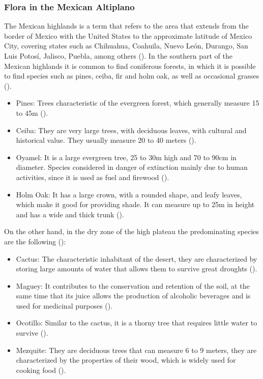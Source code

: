 \documentclass{amsart}
\begin{document}
            \subsubsection{Flora in the Mexican Altiplano}
            The Mexican highlands is a term that refers to the area that extends from the border of Mexico with the United States to the approximate latitude of Mexico City, covering states such as Chihuahua, Coahuila, Nuevo León, Durango, San Luis Potosí, Jalisco, Puebla, among others (\cite{Lifeder}).
            In the southern part of the Mexican highlands it is common to find coniferous forests, in which it is possible to find species such as pines, ceiba, fir and holm oak, as well as occasional grasses (\cite{Lifeder}).
            \begin{itemize}
                \item Pines: Trees characteristic of the evergreen forest, which generally measure 15 to 45m (\cite{Masats}).
                \item Ceiba: They are very large trees, with deciduous leaves, with cultural and historical value. They usually measure 20 to 40 meters (\cite{Anónimo3}).
                \item Oyamel: It is a large evergreen tree, 25 to 30m high and 70 to 90cm in diameter. Species considered in danger of extinction mainly due to human activities, since it is used as fuel and firewood (\cite{Anónimo4}).
                \item Holm Oak: It has a large crown, with a rounded shape, and leafy leaves, which make it good for providing shade. It can measure up to 25m in height and has a wide and thick trunk (\cite{Aquae}).
            \end{itemize}

            On the other hand, in the dry zone of the high plateau the predominating species are the following (\cite{Lifeder}):
            \begin{itemize}
                \item Cactus: The characteristic inhabitant of the desert, they are characterized by storing large amounts of water that allows them to survive great droughts (\cite{Hernández}).
                \item Maguey: It contributes to the conservation and retention of the soil, at the same time that its juice allows the production of alcoholic beverages and is used for medicinal purposes (\cite{Hernández}).
                \item Ocotillo: Similar to the cactus, it is a thorny tree that requires little water to survive (\cite{Hernández}).
                \item Mezquite: They are deciduous trees that can measure 6 to 9 meters, they are characterized by the properties of their wood, which is widely used for cooking food (\cite{Anónimo5}).
             \end{itemize}
\end{document}
